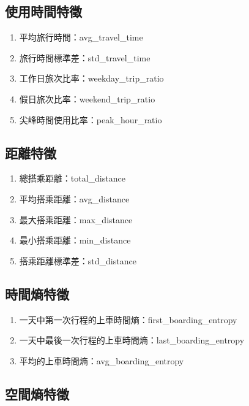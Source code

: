 \subsection{使用時間特徵}\label{ux4f7fux7528ux6642ux9593ux7279ux5fb5}

\begin{enumerate}
\def\labelenumi{\arabic{enumi}.}
\tightlist
\item
  平均旅行時間：avg\_travel\_time
\item
  旅行時間標準差：std\_travel\_time
\item
  工作日旅次比率：weekday\_trip\_ratio
\item
  假日旅次比率：weekend\_trip\_ratio
\item
  尖峰時間使用比率：peak\_hour\_ratio
\end{enumerate}

\subsection{距離特徵}\label{ux8dddux96e2ux7279ux5fb5}

\begin{enumerate}
\def\labelenumi{\arabic{enumi}.}
\tightlist
\item
  總搭乘距離：total\_distance
\item
  平均搭乘距離：avg\_distance
\item
  最大搭乘距離：max\_distance
\item
  最小搭乘距離：min\_distance
\item
  搭乘距離標準差：std\_distance
\end{enumerate}

\subsection{時間熵特徵}\label{ux6642ux9593ux71b5ux7279ux5fb5}

\begin{enumerate}
\def\labelenumi{\arabic{enumi}.}
\tightlist
\item
  一天中第一次行程的上車時間熵：first\_boarding\_entropy
\item
  一天中最後一次行程的上車時間熵：last\_boarding\_entropy
\item
  平均的上車時間熵：avg\_boarding\_entropy
\end{enumerate}

\subsection{空間熵特徵}\label{ux7a7aux9593ux71b5ux7279ux5fb5}

